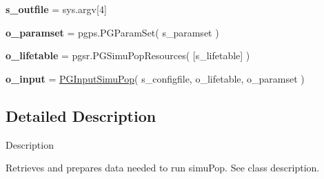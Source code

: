 \begin{DoxyCompactItemize}
\item 
{\bfseries s\+\_\+outfile} = sys.\+argv\mbox{[}4\mbox{]}\hypertarget{namespacenegui_1_1pginputsimupop_a43dc89670d5ffaa1cfb5f3af3a910114}{}\label{namespacenegui_1_1pginputsimupop_a43dc89670d5ffaa1cfb5f3af3a910114}

\item 
{\bfseries o\+\_\+paramset} = pgps.\+P\+G\+Param\+Set( s\+\_\+paramset )\hypertarget{namespacenegui_1_1pginputsimupop_ac0b61e7e37d60e3975dabaab3bd3860a}{}\label{namespacenegui_1_1pginputsimupop_ac0b61e7e37d60e3975dabaab3bd3860a}

\item 
{\bfseries o\+\_\+lifetable} = pgsr.\+P\+G\+Simu\+Pop\+Resources( \mbox{[}s\+\_\+lifetable\mbox{]} )\hypertarget{namespacenegui_1_1pginputsimupop_a29862789f653e600c71f7e493da85fe6}{}\label{namespacenegui_1_1pginputsimupop_a29862789f653e600c71f7e493da85fe6}

\item 
{\bfseries o\+\_\+input} = \hyperlink{classnegui_1_1pginputsimupop_1_1PGInputSimuPop}{P\+G\+Input\+Simu\+Pop}( s\+\_\+configfile, o\+\_\+lifetable, o\+\_\+paramset )\hypertarget{namespacenegui_1_1pginputsimupop_ab1875160da07b1636155bb3793562c2d}{}\label{namespacenegui_1_1pginputsimupop_ab1875160da07b1636155bb3793562c2d}

\end{DoxyCompactItemize}


\subsection{Detailed Description}
\begin{DoxyVerb}Description

Retrieves and prepares data needed to run simuPop.  See class description.\end{DoxyVerb}
 
